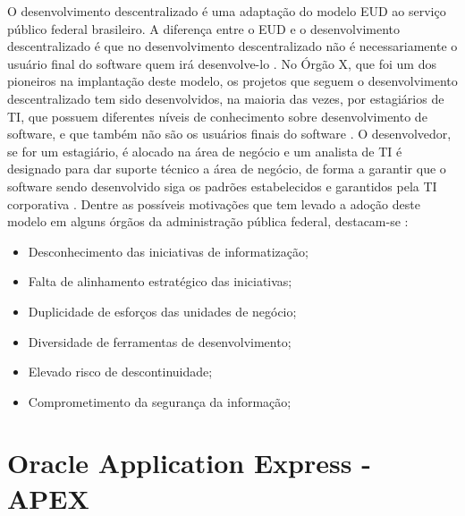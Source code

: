 O desenvolvimento descentralizado é uma adaptação do modelo EUD ao serviço público federal brasileiro. A diferença entre o EUD e o desenvolvimento descentralizado é que no desenvolvimento descentralizado não é necessariamente o usuário final do software quem irá desenvolve-lo \cite{artigoTcuGovTI}. No Órgão X, que foi um dos pioneiros na implantação deste modelo, os projetos que seguem o desenvolvimento descentralizado tem sido desenvolvidos, na maioria das vezes, por estagiários de TI, que possuem diferentes níveis de conhecimento sobre desenvolvimento de software, e que também não são os usuários finais do software \cite{artigoTcuGovTI}. O desenvolvedor, se for um estagiário, é alocado na área de negócio e um analista de TI é designado para dar suporte técnico a área de negócio, de forma a garantir que o software sendo desenvolvido siga os padrões estabelecidos e garantidos pela TI corporativa \cite{artigoTcuGovTI}.
Dentre as possíveis motivações que tem levado a adoção deste modelo em alguns órgãos da administração pública federal, destacam-se \cite{slideTCU}:

\begin{itemize}
\item Desconhecimento das iniciativas de informatização;
\item Falta de alinhamento estratégico das iniciativas;
\item Duplicidade de esforços das unidades de negócio;
\item Diversidade de ferramentas de desenvolvimento;
\item Elevado risco de descontinuidade;
\item Comprometimento da segurança da informação;
\end{itemize}
\clearpage

\section{Oracle Application Express - APEX}

